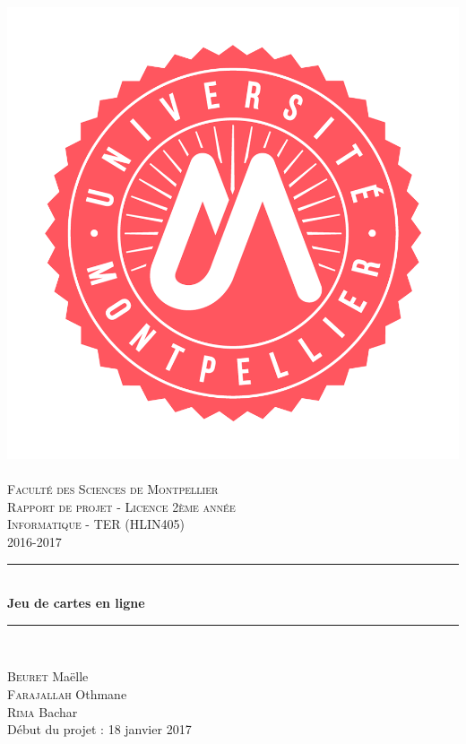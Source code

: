 \documentclass[12pt]{report}
\date{April 2017}
\newcommand{\HRule}{\rule{\linewidth}{0.5mm}}
\begin{document}
	\begin{titlepage}

		\begin{center}

			\includegraphics[scale=0.11]{logo-um.png}~\\[1.5cm]
			\textsc{\Large Faculté des Sciences de Montpellier}\\[2cm]
			\textsc{\Large Rapport de projet - Licence 2ème année}\\[0.5cm]
			\textsc{\Large Informatique - TER (HLIN405)}\\[0.5cm]
			\textsc{\Large 2016-2017}\\[1.5cm]

			\HRule \\[0.4cm]
			{ \huge \bfseries Jeu de cartes en ligne\\[0.4cm] }

			\HRule \\[2cm]

			\begin{flushleft}
				\large	\textsc{Beuret} Maëlle\\[0.5cm]
				\large	\textsc{Farajallah} Othmane\\[0.5cm]
				\large	\textsc{Rima} Bachar\\[0.5cm]
				Début du projet : 18 janvier 2017
			\end{flushleft}


\end{center}
\end{titlepage}
\end{document}
